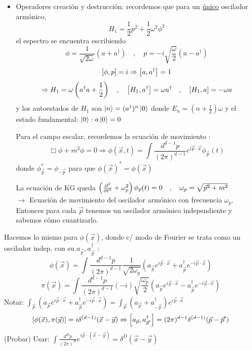 \begin{itemize}
    \item Operadores creación y destrucción: recordemos que para un \underline{único} oscilador armónico,
          $$ H_1 = \frac{1}{2} p^2 + \frac{1}{2} \omega^2 \phi^2 $$
          el espectro se encuentra escribiendo
          $$ \phi = \frac{1}{\sqrt{2\omega}} (a + a^\dagger) \quad , \quad p = -i \sqrt{\frac{\omega}{2}} (a - a^\dagger) $$
          $$ \comm{\phi}{p} = i \Rightarrow \comm{a}{a^\dagger} = 1 $$
          $$ \Rightarrow H_1= \omega \left( a^\dagger a + \frac{1}{2} \right) \quad , \quad \comm{H_1}{a^\dagger} = \omega a^\dagger \quad , \quad \comm{H_1}{a} = -\omega a $$
          y los autoestados de $H_1$ son $\ket{n} = (a^\dagger)^n \ket{0}$ donde $E_n = (n + \frac{1}{2})\omega$ y el estado fundamental: $\ket{0} : a\ket{0} = 0$

          Para el campo escalar, recordemos la ecuación de movimiento :
          $$ \Box\phi+m^2\phi = 0 \Rightarrow \phi(\vec{x},t) = \int \frac{d^{d-1}p}{(2\pi)^{d-1}} e^{i\vec{p}\cdot\vec{x}} \phi_{\vec{p}}(t) $$
          donde $\phi_{\vec{p}}^* = \phi_{-\vec{p}}$ para que $\phi(\vec{x})^* = \phi(\vec{x})$

          La ecuación de KG queda $\left(\pdv[2]{}{t} + \omega_p^2\right) \phi_{\vec{p}}(t) = 0 \quad , \quad \omega_p = \sqrt{\vec{p}^2 + m^2}$ \\
          $\rightarrow$ Ecuación de  movimiento del oscilador armónico con frecuencia $\omega_p$. Entonces para cada $\vec{p}$ tenemos un oscilador armónico independiente y sabemos cómo cuantizarlo.
\end{itemize}

\noindent Hacemos lo mismo para $\phi(\vec{x})$, donde c/ modo de Fourier se trata como un oscilador indep. con su $a_{\vec{p}}, a_{\vec{p}}^\dagger$ :
$$ \phi(\vec{x}) = \int \frac{d^{d-1}p}{(2\pi)^{d-1}} \frac{1}{\sqrt{2\omega_p}} (a_{\vec{p}} e^{i\vec{p}\cdot\vec{x}} + a_{\vec{p}}^\dagger e^{-i\vec{p}\cdot\vec{x}}) $$
$$ \pi(\vec{x}) = \int \frac{d^{d-1}p}{(2\pi)^{d-1}} (-i) \sqrt{\frac{\omega_p}{2}} (a_{\vec{p}} e^{i\vec{p}\cdot\vec{x}} - a_{\vec{p}}^\dagger e^{-i\vec{p}\cdot\vec{x}}) $$
Notar: $\int_{\vec{p}} (a_{\vec{p}} e^{i\vec{p}\cdot\vec{x}} + a_{\vec{p}}^\dagger e^{-i\vec{p}\cdot\vec{x}}) = \int_{\vec{p}} (a_{\vec{p}} + a_{-\vec{p}}^\dagger) e^{i\vec{p}\cdot\vec{x}}$
$$ \comm{\phi(\vec{x})}{\pi(\vec{y})} = i \delta^{(d-1)}(\vec{x}-\vec{y}) \Leftrightarrow \comm{a_{\vec{p}}}{a_{\vec{p}'}^\dagger} = (2\pi)^{d-1} \delta^{(d-1)}(\vec{p}-\vec{p}') $$
(Probar) Usar: $\int \frac{d^D p}{(2\pi)^D} e^{i\vec{p}\cdot(\vec{x}-\vec{y})} = \delta^D(\vec{x}-\vec{y})$


